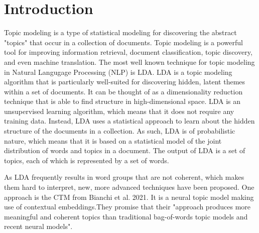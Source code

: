 \documentclass[fleqn,10pt]{SelfArx} %
\begin{document}
\maketitle %

\tableofcontents %

\thispagestyle{empty} %


\section*{Introduction} %
Topic modeling is a type of statistical modeling for discovering the abstract "topics" that occur in a collection of documents. Topic modeling is a powerful tool for improving information retrieval, document classification, topic discovery, and even machine translation. The most well known technique for topic modeling in Natural Langugage Processing (NLP) is LDA. LDA is a topic modeling algorithm that is particularly well-suited for discovering hidden, latent themes within a set of documents. It can be thought of as a dimensionality reduction technique that is able to find structure in high-dimensional space. LDA is an unsupervised learning algorithm, which means that it does not require any training data. Instead, LDA uses a statistical approach to learn about the hidden structure of the documents in a collection. As such, LDA is of probabilistic nature, which means that it is based on a statistical model of the joint distribution of words and topics in a document. The output of LDA is a set of topics, each of which is represented by a set of words.

As LDA frequently results in word groups that are not coherent, which makes them hard to interpret, new, more advanced techniques have been proposed. One approach is the CTM from Bianchi et al. 2021. It is a neural topic model making use of contextual embeddings.They promise that their "approach produces more meaningful and coherent topics than traditional bag-of-words topic models and recent neural models".
\end{document}
